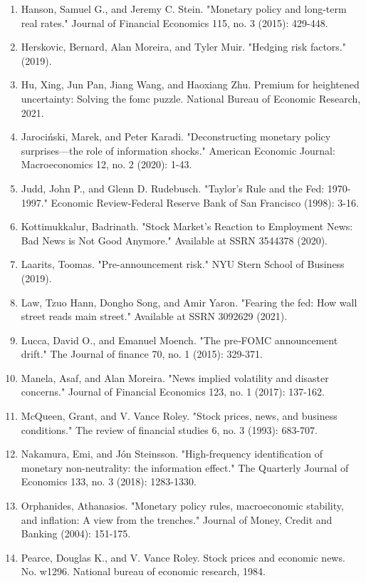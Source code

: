 \documentclass[12pt]{article}
\begin{document}
\begin{enumerate}
    \item{Hanson, Samuel G., and Jeremy C. Stein. "Monetary policy and long-term real rates." Journal of Financial Economics 115, no. 3 (2015): 429-448.}
    \item{Herskovic, Bernard, Alan Moreira, and Tyler Muir. "Hedging risk factors." (2019).}
    \item{Hu, Xing, Jun Pan, Jiang Wang, and Haoxiang Zhu. Premium for heightened uncertainty: Solving the fomc puzzle. National Bureau of Economic Research, 2021.}
    \item{Jarociński, Marek, and Peter Karadi. "Deconstructing monetary policy surprises—the role of information shocks." American Economic Journal: Macroeconomics 12, no. 2 (2020): 1-43.}
    \item{Judd, John P., and Glenn D. Rudebusch. "Taylor's Rule and the Fed: 1970-1997." Economic Review-Federal Reserve Bank of San Francisco (1998): 3-16.}
    \item{Kottimukkalur, Badrinath. "Stock Market's Reaction to Employment News: Bad News is Not Good Anymore." Available at SSRN 3544378 (2020).}
    \item{Laarits, Toomas. "Pre-announcement risk." NYU Stern School of Business (2019).}
    \item{Law, Tzuo Hann, Dongho Song, and Amir Yaron. "Fearing the fed: How wall street reads main street." Available at SSRN 3092629 (2021).}
    \item{Lucca, David O., and Emanuel Moench. "The pre‐FOMC announcement drift." The Journal of finance 70, no. 1 (2015): 329-371.}
    \item{Manela, Asaf, and Alan Moreira. "News implied volatility and disaster concerns." Journal of Financial Economics 123, no. 1 (2017): 137-162.}
    \item{McQueen, Grant, and V. Vance Roley. "Stock prices, news, and business conditions." The review of financial studies 6, no. 3 (1993): 683-707.}
    \item{Nakamura, Emi, and Jón Steinsson. "High-frequency identification of monetary non-neutrality: the information effect." The Quarterly Journal of Economics 133, no. 3 (2018): 1283-1330.}
    \item{Orphanides, Athanasios. "Monetary policy rules, macroeconomic stability, and inflation: A view from the trenches." Journal of Money, Credit and Banking (2004): 151-175.}
    \item{Pearce, Douglas K., and V. Vance Roley. Stock prices and economic news. No. w1296. National bureau of economic research, 1984.}

\end{enumerate}
\end{document}
